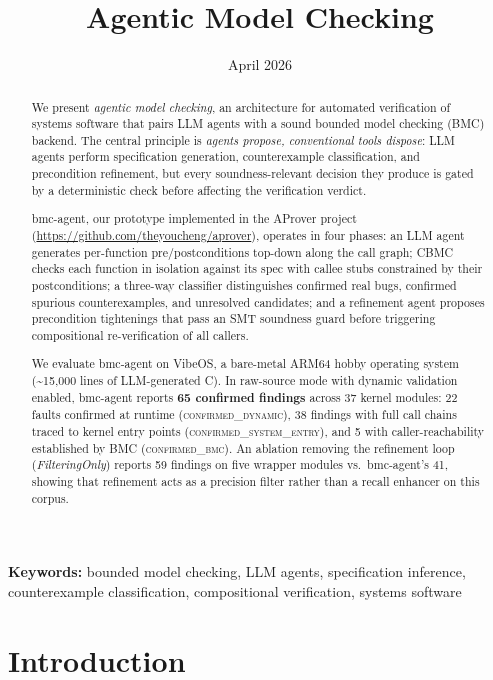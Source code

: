 \documentclass[11pt,a4paper]{article}
\title{\textbf{Agentic Model Checking}}
\date{April 2026}
\newcommand{\tool}{bmc-agent\xspace}
\newcommand{\vibeos}{VibeOS\xspace}
\newcommand{\dynconf}{\textsc{confirmed\_dynamic}\xspace}
\newcommand{\sysconf}{\textsc{confirmed\_system\_entry}\xspace}
\newcommand{\bmcconf}{\textsc{confirmed\_bmc}\xspace}
\begin{document}
\maketitle

\begin{abstract}
We present \emph{agentic model checking}, an architecture for automated
verification of systems software that pairs LLM agents with a sound bounded
model checking (BMC) backend. The central principle is \emph{agents propose,
conventional tools dispose}: LLM agents perform specification generation,
counterexample classification, and precondition refinement, but every
soundness-relevant decision they produce is gated by a deterministic check
before affecting the verification verdict.

\tool, our prototype implemented in the AProver project
(\url{https://github.com/theyoucheng/aprover}), operates in four phases: an LLM agent generates
per-function pre/postconditions top-down along the call graph; CBMC checks
each function in isolation against its spec with callee stubs constrained by
their postconditions; a three-way classifier distinguishes confirmed real bugs,
confirmed spurious counterexamples, and unresolved candidates; and a
refinement agent proposes precondition tightenings that pass an SMT soundness
guard before triggering compositional re-verification of all callers.

We evaluate \tool on \vibeos, a bare-metal ARM64 hobby operating system
(\textasciitilde{}15{,}000 lines of LLM-generated C). In raw-source mode with
dynamic validation enabled, \tool reports \textbf{65 confirmed findings}
across 37 kernel modules: 22 faults confirmed at runtime (\dynconf{}),
38 findings with full call chains traced to kernel entry points
(\sysconf{}), and 5 with caller-reachability established by BMC
(\bmcconf{}). An ablation removing the refinement loop
(\emph{FilteringOnly}) reports 59 findings on five wrapper modules vs.\
\tool's 41, showing that refinement acts as a precision filter rather than a
recall enhancer on this corpus.
\end{abstract}

\noindent\textbf{Keywords:} bounded model checking, LLM agents, specification
inference, counterexample classification, compositional verification, systems
software

\section{Introduction}
\label{sec:intro}
\end{document}
